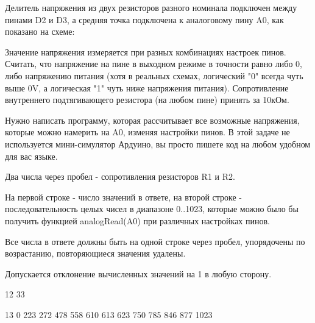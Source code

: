 
Делитель напряжения из двух резисторов разного номинала подключен между пинами D2 и D3, а средняя точка подключена к аналоговому пину A0, как показано на схеме:


Значение напряжения измеряется при разных комбинациях настроек пинов. Считать, что напряжение на пине в выходном режиме в точности равно либо 0, либо напряжению питания (хотя в реальных схемах, логический "0" всегда чуть выше 0V, а логическая "1" чуть ниже напряжения питания). Сопротивление внутреннего подтягивающего резистора (на любом пине) принять за 10кОм.  

Нужно написать программу, которая рассчитывает все возможные напряжения, которые можно намерить на A0, изменяя настройки пинов.  В этой задаче не используется мини-симулятор Ардуино, вы просто пишете код на любом удобном для вас языке.

Два числа через пробел - сопротивления резисторов R1 и R2.

\outputfmtSection
На первой строке - число значений в ответе, на второй строке - последовательность целых чисел в диапазоне 0..1023, 
которые можно было бы получить функцией analogRead(A0) при различных настройках пинов.  

Все числа в ответе должны быть  на одной строке через пробел,  упорядочены по возрастанию,  
повторяющиеся значения удалены. 

Допускается отклонение вычисленных значений на 1 в любую сторону.

\begin{myverbbox}[\small]{\vinput}
    12 33
\end{myverbbox}
\begin{myverbbox}[\small]{\voutput}
    13
    0 223 272 478 558 610 613 623 750 785 846 877 1023
\end{myverbbox}

